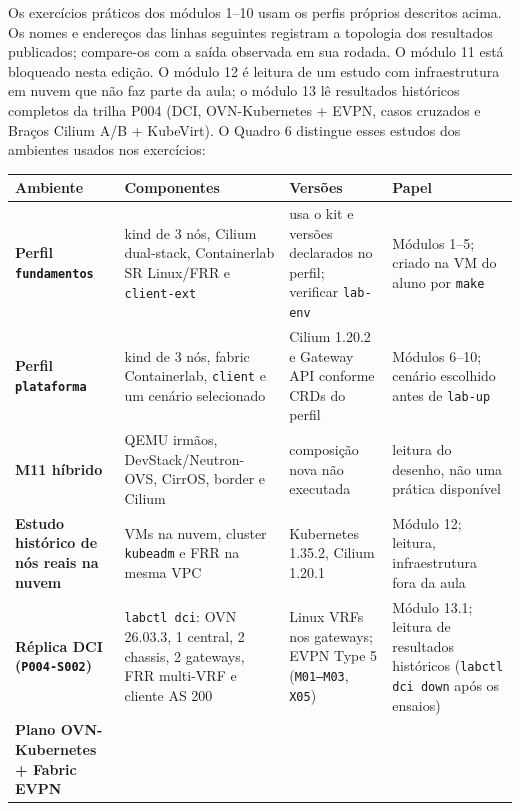 \documentclass[12pt,openany,oneside,a4paper,chapter=TITLE,english,brazil]{abntex2}
\begin{document}
Os exercícios práticos dos módulos 1--10 usam os perfis próprios descritos
acima. Os nomes e endereços das linhas seguintes registram a topologia dos
resultados publicados; compare-os com a saída observada em sua rodada. O módulo
11 está bloqueado nesta edição. O módulo 12 é leitura de um estudo com infraestrutura em nuvem
que não faz parte da aula; o módulo 13 lê resultados históricos completos da
trilha P004 (DCI, OVN-Kubernetes + EVPN, casos cruzados e Braços Cilium A/B +
KubeVirt). O Quadro 6 distingue esses estudos dos ambientes usados nos exercícios:

\begin{quadro}[!htbp]
\caption{Ambientes e estudos documentados no guia}
\footnotesize
\begin{tabularx}{\textwidth}{|>{\raggedright\arraybackslash\hsize=0.824\hsize}X|>{\raggedright\arraybackslash\hsize=1.158\hsize}X|>{\raggedright\arraybackslash\hsize=0.975\hsize}X|>{\raggedright\arraybackslash\hsize=1.042\hsize}X|}
\hline
\textbf{Ambiente} & \textbf{Componentes} & \textbf{Versões} & \textbf{Papel} \\
\hline
\textbf{Perfil \texttt{fundamentos}} & kind de 3 nós, Cilium dual-stack, Containerlab SR Linux/FRR e
\texttt{client-{}\allowbreak{}ext} & usa o kit e versões declarados no perfil; verificar
\texttt{lab-{}\allowbreak{}env} & Módulos 1--5; criado na VM do aluno por \texttt{make} \\
\hline
\textbf{Perfil \texttt{plataforma}} & kind de 3 nós, fabric Containerlab, \texttt{client} e um cenário
selecionado & Cilium 1.20.2 e Gateway API conforme CRDs do perfil & Módulos 6--10; cenário escolhido antes de \texttt{lab-{}\allowbreak{}up} \\
\hline
\textbf{M11 híbrido} & QEMU irmãos, DevStack/Neutron-OVS, CirrOS, border e Cilium & composição nova não executada & leitura do desenho, não uma prática disponível \\
\hline
\textbf{Estudo histórico de nós reais na nuvem} & 3 VMs na nuvem, cluster \texttt{kubeadm} e FRR na mesma VPC & Kubernetes 1.35.2, Cilium 1.20.1 & Módulo 12; leitura, infraestrutura fora da aula \\
\hline
\textbf{Réplica DCI (\texttt{P004-{}\allowbreak{}S002})} & \texttt{labctl dci}: OVN 26.03.3, 1 central, 2 chassis, 2 gateways, FRR
multi-VRF e cliente AS 200 & Linux VRFs nos gateways; EVPN Type 5 (\texttt{M01–M03}, \texttt{X05}) & Módulo 13.1; leitura de resultados históricos (\texttt{labctl dci down}
após os ensaios) \\
\hline
\textbf{Plano OVN-Kubernetes + Fabric EVPN
}
\end{tabularx}
\end{quadro}
\end{document}
